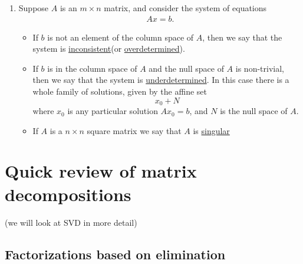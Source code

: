 \begin{enumerate}
\item Suppose $A$ is an $m\times n$ matrix, and consider the system of equations 
    \begin{align*}
        Ax = b.
    \end{align*}
    \begin{itemize}
        \item If $b$ is not an element of the column space of $A$, then we say that the system is \underline{inconsistent}(or \underline{overdetermined}). 
        \item If $b$ is in the column space of $A$ and the null space of $A$ is non-trivial, then we say that the system is \underline{underdetermined}. In this case there is a whole family of solutions, given by the affine set
            $$x_0 + N$$
        where $x_0$ is any particular solution $Ax_0 = b$, and $N$ is the null space of $A$. 
        \item If $A$ is a $n\times n$ square matrix we say that $A$ is \underline{singular}
    \end{itemize}
\end{enumerate}

\newpage
\section{Quick review of matrix decompositions}
(we will look at SVD in more detail)

\subsection{Factorizations based on elimination}

